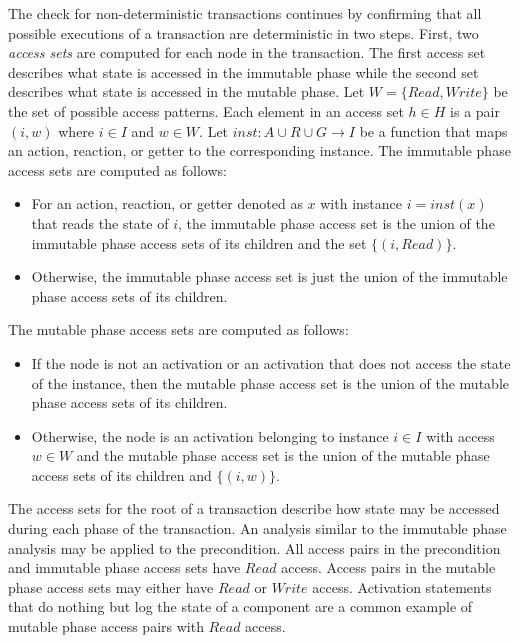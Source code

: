 The check for non-deterministic transactions continues by confirming that all possible executions of a transaction are deterministic in two steps.
First, two \emph{access sets} are computed for each node in the transaction.
The first access set describes what state is accessed in the immutable phase while the second set describes what state is accessed in the mutable phase.
Let $W = \{ \mathit{Read}, \mathit{Write} \}$ be the set of possible access patterns.
Each element in an access set $h \in H$ is a pair $(i,w)$ where $i \in I$ and $w \in W$.
Let $\mathit{inst}: A \cup R \cup G \to I$ be a function that maps an action, reaction, or getter to the corresponding instance.
The immutable phase access sets are computed as follows:
\begin{itemize}
  \item For an action, reaction, or getter denoted as $x$ with instance $i = \mathit{inst}(x)$ that reads the state of $i$, the immutable phase access set is the union of the immutable phase access sets of its children and the set $\{ (i, \mathit{Read}) \}$.
  \item Otherwise, the immutable phase access set is just the union of the immutable phase access sets of its children.
\end{itemize}
The mutable phase access sets are computed as follows:
\begin{itemize}
  \item If the node is not an activation or an activation that does not access the state of the instance, then the mutable phase access set is the union of the mutable phase access sets of its children.
  \item Otherwise, the node is an activation belonging to instance $i \in I$ with access $w \in W$ and the mutable phase access set is the union of the mutable phase access sets of its children and $\{ (i, w) \}$.
\end{itemize}
The access sets for the root of a transaction describe how state may be accessed during each phase of the transaction.
An analysis similar to the immutable phase analysis may be applied to the precondition.
All access pairs in the precondition and immutable phase access sets have $\mathit{Read}$ access.
Access pairs in the mutable phase access sets may either have $\mathit{Read}$ or $\mathit{Write}$ access.
Activation statements that do nothing but log the state of a component are a common example of mutable phase access pairs with $\mathit{Read}$ access.

